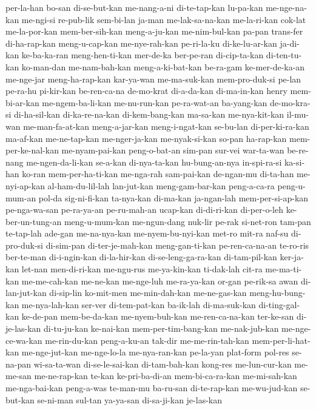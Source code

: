 {per-la-han bo-san di-se-but-kan me-nang-a-ni di-te-tap-kan lu-pa-kan me-nge-na-kan me-ngi-si
re-pub-lik sem-bi-lan ja-man me-lak-sa-na-kan me-la-ri-kan cok-lat me-la-por-kan mem-ber-sih-kan
meng-a-ju-kan me-nim-bul-kan pa-pan trans-fer di-ha-rap-kan meng-u-cap-kan me-nye-rah-kan pe-ri-la-ku
di-ke-lu-ar-kan ja-di-kan ke-ba-ka-ran meng-hen-ti-kan mer-de-ka ber-pe-ran di-cip-ta-kan di-ten-tu-kan
ko-man-dan me-nam-bah-kan meng-a-ki-bat-kan be-ra-gam ke-mer-de-ka-an me-nge-jar meng-ha-rap-kan kar-ya-wan
me-ma-suk-kan mem-pro-duk-si pe-lan pe-ra-hu pi-kir-kan be-ren-ca-na de-mo-krat di-a-da-kan
di-ma-in-kan henry mem-bi-ar-kan me-ngem-ba-li-kan me-nu-run-kan pe-ra-wat-an ba-yang-kan de-mo-kra-si
di-ha-sil-kan di-ka-re-na-kan di-kem-bang-kan ma-sa-kan me-nya-kit-kan il-mu-wan me-man-fa-at-kan meng-a-jar-kan
meng-i-ngat-kan se-bu-lan di-per-ki-ra-kan ma-af-kan me-ne-tap-kan me-nger-ja-kan me-nyak-si-kan so-pan
ha-rap-kan mem-per-ke-nal-kan me-nyam-pai-kan peng-o-bat-an sim-pan sur-vei war-ta-wan be-re-nang
me-ngen-da-li-kan se-a-kan di-nya-ta-kan hu-bung-an-nya in-spi-ra-si ka-si-han ko-ran mem-per-ha-ti-kan
me-nga-rah sam-pai-kan de-ngan-mu di-ta-han me-nyi-ap-kan al-ham-du-lil-lah lan-jut-kan meng-gam-bar-kan
peng-a-ca-ra peng-u-mum-an pol-da sig-ni-fi-kan ta-nya-kan di-ma-kan ja-ngan-lah mem-per-si-ap-kan
pe-nga-wa-san pe-ra-ya-an pe-ru-mah-an ucap-kan di-di-ri-kan di-per-o-leh ke-ber-un-tung-an meng-u-mum-kan
me-ngun-dang nuk-lir pe-rak si-net-ron tam-pan te-tap-lah ade-gan me-na-nya-kan
me-nyem-bu-nyi-kan met-ro mit-ra naf-su di-pro-duk-si di-sim-pan di-ter-je-mah-kan meng-gan-ti-kan
pe-ren-ca-na-an te-ro-ris ber-te-man di-i-ngin-kan di-la-hir-kan di-se-leng-ga-ra-kan di-tam-pil-kan ker-ja-kan
let-nan men-di-ri-kan me-ngu-rus me-ya-kin-kan ti-dak-lah cit-ra me-ma-ti-kan me-me-cah-kan
me-ne-kan me-nge-luh me-ra-ya-kan or-gan pe-rik-sa awan di-lan-jut-kan di-sip-lin
ko-mit-men me-min-dah-kan me-ne-gas-kan meng-hu-bung-kan me-nya-lah-kan ser-ver di-tem-pat-kan ba-ik-lah
di-ma-suk-kan di-ting-gal-kan ke-de-pan mem-be-da-kan me-nyem-buh-kan me-ren-ca-na-kan ter-ke-san di-je-las-kan
di-tu-ju-kan ke-nai-kan mem-per-tim-bang-kan me-nak-jub-kan me-nge-ce-wa-kan me-rin-du-kan peng-a-ku-an tak-dir
me-me-rin-tah-kan mem-per-li-hat-kan me-nge-jut-kan me-nge-lo-la me-nya-ran-kan pe-la-yan plat-form pol-res
se-na-pan wi-sa-ta-wan di-se-le-sai-kan di-tam-bah-kan kong-res me-lun-cur-kan me-me-san me-ne-rap-kan
te-kan ke-pri-ba-di-an mem-bi-ca-ra-kan me-mi-sah-kan me-nga-bai-kan peng-a-was te-man-mu ba-ru-san
di-te-rap-kan me-wu-jud-kan se-but-kan se-ni-man sul-tan ya-ya-san di-sa-ji-kan je-las-kan
}

